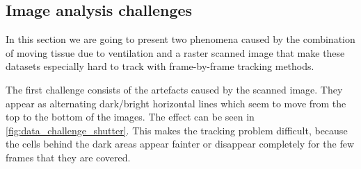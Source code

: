 	\subsection{Image analysis challenges \statusseconddraft}
	\label{sec:data_challenges}
	In this section we are going to present two phenomena caused by the combination of moving tissue due to ventilation and a raster scanned image that make these datasets especially hard to track with frame-by-frame tracking methods.
	
	The first challenge consists of the artefacts caused by the scanned image. They appear as alternating dark/bright horizontal lines which seem to move from the top to the bottom of the images. The effect can be seen in \cref{fig:data_challenge_shutter}. This makes the tracking problem difficult, because the cells behind the dark areas appear fainter or disappear completely for the few frames that they are covered.
		
